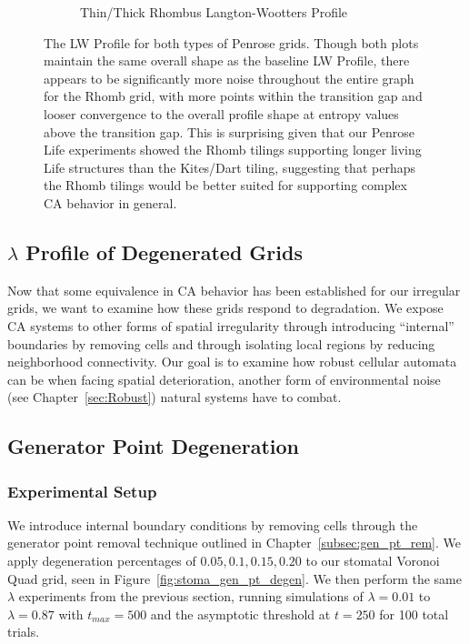 \documentclass[a4paper,11pt]{article}
\begin{document}
\begin{figure}[htp]
\begin{subfigure}[t]{0.65\textwidth}
  \caption{Thin/Thick Rhombus Langton-Wootters Profile}
  \label{fig:crh_lw_profile}
  \end{subfigure}
\caption[Penrose Langton-Wootters Profile]{
  The LW Profile for both types of Penrose grids. Though both plots maintain the same overall shape as the baseline LW Profile, there appears to be significantly more noise throughout the entire graph for the Rhomb grid, with more points within the transition gap and looser convergence to the overall profile shape at entropy values above the transition gap. This is surprising given that our Penrose Life experiments showed the Rhomb tilings supporting longer living Life structures than the Kites/Dart tiling, suggesting that perhaps the Rhomb tilings would be better suited for supporting complex CA behavior in general.
}
\label{fig:penrose_lw_profile}
\end{figure}

\subsection{$\lambda$ Profile of Degenerated Grids}

Now that some equivalence in CA behavior has been established for our irregular grids, we want to examine how these grids respond to degradation. We expose CA systems to other forms of spatial irregularity through introducing ``internal'' boundaries by removing cells and through isolating local regions by reducing neighborhood connectivity. Our goal is to examine how robust cellular automata can be when facing spatial deterioration, another form of environmental noise (see Chapter~\ref{sec:Robust}) natural systems have to combat.

\subsection{Generator Point Degeneration}
\label{subsec:ch6_gen_pt_degen}
\subsubsection*{Experimental Setup}
We introduce internal boundary conditions by removing cells through the generator point removal technique outlined in Chapter~\ref{subsec:gen_pt_rem}. We apply degeneration percentages of $0.05,0.1, 0.15, 0.20$ to our stomatal Voronoi Quad grid, seen in Figure~\ref{fig:stoma_gen_pt_degen}. We then perform the same $\lambda$ experiments from the previous section, running simulations of $\lambda=0.01$ to $\lambda=0.87$ with $t_{max} = 500$ and the asymptotic threshold at $t=250$ for 100 total trials. 
\end{document}
